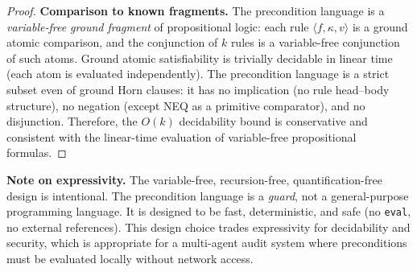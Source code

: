 \begin{proof}
\textbf{Comparison to known fragments.} The precondition language is a \emph{variable-free ground fragment} of propositional logic: each rule $\langle f, \kappa, v \rangle$ is a ground atomic comparison, and the conjunction of $k$ rules is a variable-free conjunction of such atoms. Ground atomic satisfiability is trivially decidable in linear time (each atom is evaluated independently). The precondition language is a strict subset even of ground Horn clauses: it has no implication (no rule head--body structure), no negation (except NEQ as a primitive comparator), and no disjunction. Therefore, the $O(k)$ decidability bound is conservative and consistent with the linear-time evaluation of variable-free propositional formulas.
\end{proof}

\textbf{Note on expressivity.} The variable-free, recursion-free, quantification-free design is intentional. The precondition language is a \textit{guard}, not a general-purpose programming language. It is designed to be fast, deterministic, and safe (no \texttt{eval}, no external references). This design choice trades expressivity for decidability and security, which is appropriate for a multi-agent audit system where preconditions must be evaluated locally without network access.
